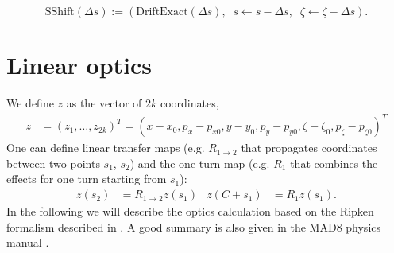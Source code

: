 \[
	\text{SShift}(\Delta s) := ( \text{DriftExact}(\Delta s),\;\; s \leftarrow s - \Delta s,\;\; \zeta \leftarrow \zeta - \Delta s ).
\]







\chapter{Linear optics}
\label{opt}
We define $z$ as the vector of $2 k$ coordinates,
\begin{align}\label{opt:eqn:1}
z&=(z_1,\ldots,z_{2k})^T=(x-x_0,p_x-p_{x0},y-y_0,p_y-p_{y0},\zeta-\zeta_0,p_\zeta-p_{\zeta0})^T
\end{align}
One can define linear transfer maps (e.g. $R_{1\to 2}$ that propagates coordinates between two points $s_1$, $s_2$) and the one-turn map (e.g. $R_1$ that combines the effects for one turn starting from $s_1$):
\begin{align}\label{opt:eqn:2}
z(s_2)&= R_{1\to 2} z(s_1) & z(C+s_1) &= R_1 z(s_1).
\end{align}
In the following we will describe the optics calculation based on the Ripken formalism described in \cite{willeke88}. A good summary is also given in the MAD8 physics manual \cite{mad8phys}.

